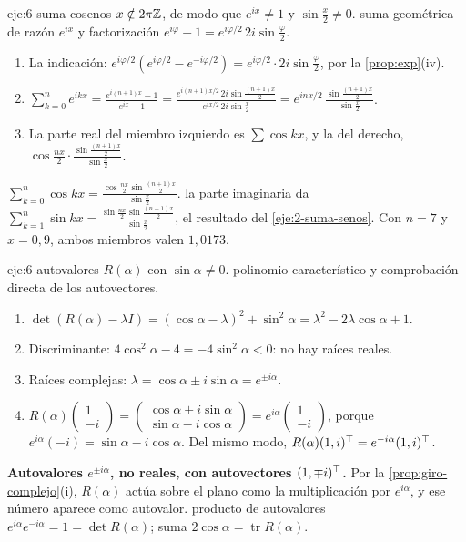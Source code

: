 \begin{solucion}{eje:6-suma-cosenos}
\datos $x\notin2\pi\mathbb{Z}$, de modo que $e^{ix}\ne1$ y $\sin\frac x2\ne0$.
\planteamiento suma geométrica de razón $e^{ix}$ y factorización $e^{i\varphi}-1=e^{i\varphi/2}\,2i\sin\frac{\varphi}{2}$.
\pasos
\begin{enumerate}[label=\arabic*.]
  \item La indicación: $e^{i\varphi/2}(e^{i\varphi/2}-e^{-i\varphi/2})=e^{i\varphi/2}\cdot2i\sin\frac{\varphi}{2}$, por la \cref{prop:exp}(iv).
  \item $\sum_{k=0}^{n}e^{ikx}=\frac{e^{i(n+1)x}-1}{e^{ix}-1}=\frac{e^{i(n+1)x/2}\,2i\sin\frac{(n+1)x}{2}}{e^{ix/2}\,2i\sin\frac{x}{2}}=e^{inx/2}\,\frac{\sin\frac{(n+1)x}{2}}{\sin\frac x2}$.
  \item La parte real del miembro izquierdo es $\sum\cos kx$, y la del derecho, $\cos\frac{nx}{2}\cdot\frac{\sin\frac{(n+1)x}{2}}{\sin\frac x2}$.
\end{enumerate}
\resultado $\displaystyle\sum_{k=0}^{n}\cos kx=\frac{\cos\frac{nx}{2}\sin\frac{(n+1)x}{2}}{\sin\frac x2}$.
\comprobacion la parte imaginaria da $\sum_{k=1}^{n}\sin kx=\frac{\sin\frac{nx}{2}\sin\frac{(n+1)x}{2}}{\sin\frac x2}$, el resultado del \cref{eje:2-suma-senos}. Con $n=7$ y $x=0{,}9$, ambos miembros valen $1{,}0173$.
\end{solucion}

\begin{solucion}{eje:6-autovalores}
\datos $R(\alpha)$ con $\sin\alpha\ne0$.
\planteamiento polinomio característico y comprobación directa de los autovectores.
\pasos
\begin{enumerate}[label=\arabic*.]
  \item $\det(R(\alpha)-\lambda I)=(\cos\alpha-\lambda)^{2}+\sin^{2}\alpha=\lambda^{2}-2\lambda\cos\alpha+1$.
  \item Discriminante: $4\cos^{2}\alpha-4=-4\sin^{2}\alpha<0$: no hay raíces reales.
  \item Raíces complejas: $\lambda=\cos\alpha\pm i\sin\alpha=e^{\pm i\alpha}$.
  \item $R(\alpha)\begin{pmatrix}1\\-i\end{pmatrix}=\begin{pmatrix}\cos\alpha+i\sin\alpha\\\sin\alpha-i\cos\alpha\end{pmatrix}=e^{i\alpha}\begin{pmatrix}1\\-i\end{pmatrix}$, porque $e^{i\alpha}(-i)=\sin\alpha-i\cos\alpha$. Del mismo modo, $R(\alpha)(1,i)^{\top}=e^{-i\alpha}(1,i)^{\top}$.
\end{enumerate}
\resultado \textbf{Autovalores $e^{\pm i\alpha}$, no reales, con autovectores $(1,\mp i)^{\top}$.} Por la \cref{prop:giro-complejo}(i), $R(\alpha)$ actúa sobre el plano como la multiplicación por $e^{i\alpha}$, y ese número aparece como autovalor.
\comprobacion producto de autovalores $e^{i\alpha}e^{-i\alpha}=1=\det R(\alpha)$; suma $2\cos\alpha=\operatorname{tr}R(\alpha)$.
\end{solucion}
